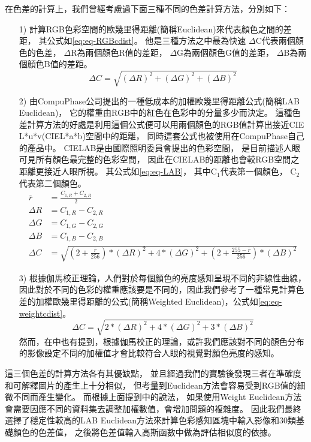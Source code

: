 \documentclass[class=NCU_thesis, crop=false]{standalone}
\begin{document}
	在色差的計算上，我們曾經考慮過下面三種不同的色差計算方法，分別如下：
	\begin{itemize}
	  \item [1)] 
	  	計算RGB色彩空間的歐幾里得距離(簡稱Euclidean)來代表顏色之間的差距，
	  	其公式如\cref{eq:eq-RGBcdist}。
	  	他是三種方法之中最為快速
	  	$\Delta$C代表兩個顏色的色差，
	  	$\Delta$R為兩個顏色R值的差距，
	  	$\Delta$G為兩個顏色G值的差距，
	  	$\Delta$B為兩個顏色B值的差距。
	  	\begin{equation}
	    \label{eq:eq-RGBcdist}
	    	\Delta C = \sqrt{(\Delta R)^2 + (\Delta G)^2 + (\Delta B)^2}
		\end{equation}

	  \item [2)]
	  	由CompuPhase公司提出的一種低成本的加權歐幾里得距離公式\cite{LABformula}(簡稱LAB Euclidean)，
	  	它的權重由RGB中的紅色在色彩中的分量多少而決定。
	  	這種色差計算方法的好處是利用這個公式便可以用兩個顏色的RGB值計算出接近CIE L*u*v(CIEL*a*b)空間中的距離，
	  	同時這套公式也被使用在CompuPhase自己的產品中。
	  	CIELAB是由國際照明委員會提出的色彩空間，
	  	是目前描述人眼可見所有顏色最完整的色彩空間，
	  	因此在CIELAB的距離也會較RGB空間之距離更接近人眼所視。
	  	其公式如\cref{eq:eq-LAB}，
	  	其中C$_{1}$代表第一個顏色，
	  	C$_{2}$代表第二個顏色。
	  	\begin{equation}
	    \label{eq:eq-LAB}
	    \begin{split}
	    	\overline{r} & = \frac{C_{1,R} + C_{2,R}}{2} \\
	    	\Delta R & = C_{1,R} - C_{2,R} \\
	    	\Delta G & = C_{1,G} - C_{2,G} \\
	    	\Delta B & = C_{1,B} - C_{2,B} \\
	    	\Delta C & = \sqrt{(2 + \frac{\overline{r}}{256}) * (\Delta R)^2 + 4 * (\Delta G)^2 + (2 + \frac{255 - \overline{r}}{256}) * (\Delta B)^2}
	    \end{split}
		\end{equation}

	  \item [3)]
	  	根據伽馬校正理論，人們對於每個顏色的亮度感知呈現不同的非線性曲線，因此對於不同的色彩的權重應該要是不同的，因此我們參考了一種常見計算色差的加權歐幾里得距離的公式(簡稱Weighted Euclidean)，公式如\cref{eq:eq-weightcdist}。
	  	\begin{equation}
	    \label{eq:eq-weightcdist}
	    	\Delta C = \sqrt{2 * (\Delta R)^2 + 4 * (\Delta G)^2 + 3 * (\Delta B)^2}
		\end{equation}
		然而，在\cite{LABformula}中也有提到，根據伽馬校正的理論，或許我們應該對不同的顏色分布的影像設定不同的加權值才會比較符合人眼的視覺對顏色亮度的感知。
	\end{itemize}
	這三個色差的計算方法各有其優缺點，
	並且經過我們的實驗後發現三者在準確度和可解釋圖片的產生上十分相似，
	但考量到Euclidean方法會容易受到RGB值的細微不同而產生變化。
	而根據上面提到\cite{LABformula}中的說法，
	如果使用Weight Euclidean方法會需要因應不同的資料集去調整加權數值，會增加問題的複雜度。
	因此我們最終選擇了穩定性較高的LAB Euclidean方法來計算色彩感知區塊中輸入影像和30類基礎顏色的色差值，
	之後將色差值輸入高斯函數中做為評估相似度的依據。
\end{document}
